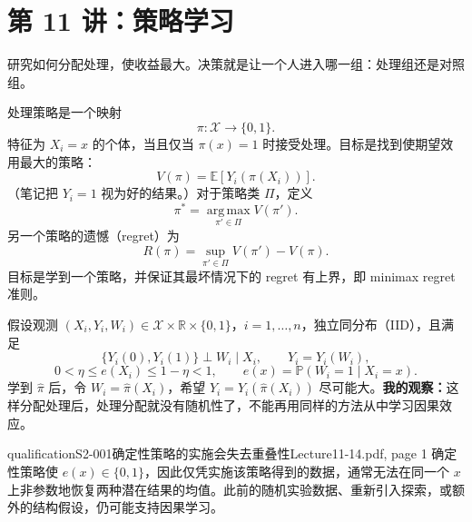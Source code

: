 \section{第 11 讲：策略学习}
研究如何分配处理，使收益最大。决策就是让一个人进入哪一组：处理组还是对照组。

处理策略是一个映射
\[
 \pi:\mathcal X\longrightarrow\{0,1\}.
\]
特征为 $X_i=x$ 的个体，当且仅当 $\pi(x)=1$ 时接受处理。目标是找到使期望效用最大的策略：
\[
 V(\pi)=\mathbb E[Y_i(\pi(X_i))].
\]
（笔记把 $Y_i=1$ 视为好的结果。）对于策略类 $\Pi$，定义
\[
 \pi^*=\operatorname*{arg\,max}_{\pi'\in\Pi}V(\pi').
\]
另一个策略的遗憾（regret）为
\[
 R(\pi)=\sup_{\pi'\in\Pi}V(\pi')-V(\pi).
\]
目标是学到一个策略，并保证其最坏情况下的 regret 有上界，即 minimax regret 准则。

假设观测 $(X_i,Y_i,W_i)\in\mathcal X\times\mathbb R\times\{0,1\}$，$i=1,\ldots,n$，独立同分布（IID），且满足
\[
 \{Y_i(0),Y_i(1)\}\perp W_i\mid X_i,\qquad Y_i=Y_i(W_i),
\]
\[
 0<\eta\le e(X_i)\le1-\eta<1,\qquad e(x)=\mathbb P(W_i=1\mid X_i=x).
\]
学到 $\widehat\pi$ 后，令 $W_i=\widehat\pi(X_i)$，希望 $Y_i=Y_i(\widehat\pi(X_i))$ 尽可能大。\textbf{我的观察：}这样分配处理后，处理分配就没有随机性了，不能再用同样的方法从中学习因果效应。

\begin{reviewnote}{qualification}{S2-001}{确定性策略的实施会失去重叠性}{Lecture11-14.pdf, page 1}
确定性策略使 $e(x)\in\{0,1\}$，因此仅凭实施该策略得到的数据，通常无法在同一个 $x$ 上非参数地恢复两种潜在结果的均值。此前的随机实验数据、重新引入探索，或额外的结构假设，仍可能支持因果学习。
\end{reviewnote}


